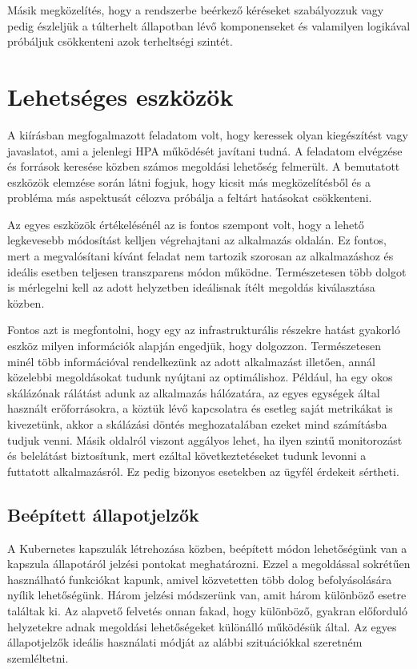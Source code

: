 Másik megközelítés, hogy a rendszerbe beérkező kéréseket szabályozzuk vagy pedig észleljük a túlterhelt állapotban lévő komponenseket és valamilyen logikával próbáljuk csökkenteni azok terheltségi szintét.

\section{Lehetséges eszközök}

A kiírásban megfogalmazott feladatom volt, hogy keressek olyan kiegészítést vagy javaslatot, ami a jelenlegi HPA működését javítani tudná.
A feladatom elvégzése és források keresése közben számos megoldási lehetőség felmerült.
A bemutatott eszközök elemzése során látni fogjuk, hogy kicsit más megközelítésből és a probléma más aspektusát célozva próbálja a feltárt hatásokat csökkenteni.

Az egyes eszközök értékelésénél az is fontos szempont volt, hogy a lehető legkevesebb módosítást kelljen végrehajtani az alkalmazás oldalán.
Ez fontos, mert a megvalósítani kívánt feladat nem tartozik szorosan az alkalmazáshoz és ideális esetben teljesen transzparens módon működne.
Természetesen több dolgot is mérlegelni kell az adott helyzetben ideálisnak ítélt megoldás kiválasztása közben.

Fontos azt is megfontolni, hogy egy az infrastrukturális részekre hatást gyakorló eszköz milyen információk alapján engedjük, hogy dolgozzon.
Természetesen minél több információval rendelkezünk az adott alkalmazást illetően, annál közelebbi megoldásokat tudunk nyújtani az optimálishoz.
Például, ha egy okos skálázónak rálátást adunk az alkalmazás hálózatára, az egyes egységek által használt erőforrásokra, a köztük lévő kapcsolatra és esetleg saját metrikákat is kivezetünk, akkor a skálázási döntés meghozatalában ezeket mind számításba tudjuk venni.
Másik oldalról viszont aggályos lehet, ha ilyen szintű monitorozást és belelátást biztosítunk, mert ezáltal következtetéseket tudunk levonni a futtatott alkalmazásról.
Ez pedig bizonyos esetekben az ügyfél érdekeit sértheti.


\subsection{Beépített állapotjelzők}
A Kubernetes kapszulák létrehozása közben, beépített módon lehetőségünk van a kapszula állapotáról jelzési pontokat meghatározni.
Ezzel a megoldással sokrétűen használható funkciókat kapunk, amivel közvetetten több dolog befolyásolására nyílik lehetőségünk.
Három jelzési módszerünk van, amit három különböző esetre találtak ki.
Az alapvető felvetés onnan fakad, hogy különböző, gyakran előforduló helyzetekre adnak megoldási lehetőségeket különálló működésük által.
Az egyes állapotjelzők ideális használati módját az alábbi szituációkkal szeretném szemléltetni.

